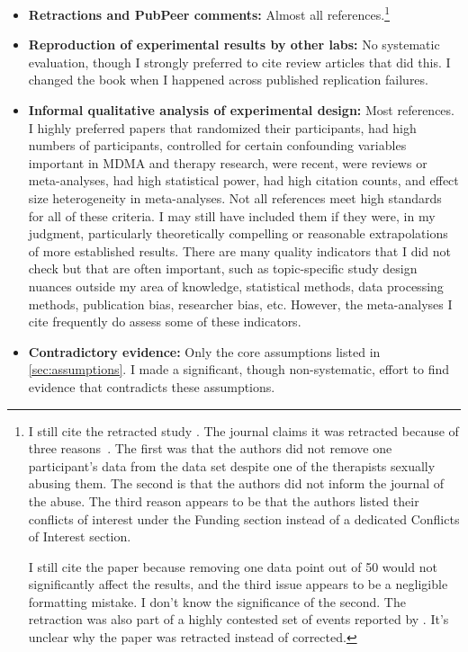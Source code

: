 \documentclass[11pt,oneside]{book}
\let\cite\parencite
\begin{document}
\begin{itemize}
    \item \textbf{Retractions and PubPeer comments:} Almost all references.\footnote{I still cite the retracted study \textcite{feducciaSSRIDiscontinuation}. The journal claims it was retracted because of three reasons~\cite{feduccia2024retraction}. The first was that the authors did not remove one participant's data from the data set despite one of the therapists sexually abusing them. The second is that the authors did not inform the journal of the abuse. The third reason appears to be that the authors listed their conflicts of interest under the Funding section instead of a dedicated Conflicts of Interest section.
    
    I still cite the paper because removing one data point out of 50 would not significantly affect the results, and the third issue appears to be a negligible formatting mistake. I don't know the significance of the second. The retraction was also part of a highly contested set of events reported by \textcite{nytPsymposia}. It's unclear why the paper was retracted instead of corrected.}
    \item \textbf{Reproduction of experimental results by other labs:} No systematic evaluation, though I strongly preferred to cite review articles that did this. I changed the book when I happened across published replication failures.
    \item \textbf{Informal qualitative analysis of experimental design:} Most references. I highly preferred papers that randomized their participants, had high numbers of participants, controlled for certain confounding variables important in MDMA and therapy research, were recent, were reviews or meta-analyses, had high statistical power, had high citation counts, and effect size heterogeneity in meta-analyses. Not all references meet high standards for all of these criteria. I may still have included them if they were, in my judgment, particularly theoretically compelling or reasonable extrapolations of more established results. There are many quality indicators that I did not check but that are often important, such as topic-specific study design nuances outside my area of knowledge, statistical methods, data processing methods, publication bias, researcher bias, etc. However, the meta-analyses I cite frequently do assess some of these indicators.
    \item \textbf{Contradictory evidence:} Only the core assumptions listed in \cref{sec:assumptions}. I made a significant, though non-systematic, effort to find evidence that contradicts these assumptions.
\end{itemize}
\end{document}
